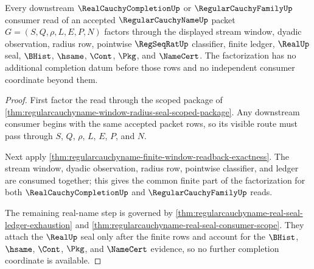 \begin{theorem}
\label{thm:regularcauchyname-bridge-consumer-factorization}
Every downstream $\RealCauchyCompletionUp$ or $\RegularCauchyFamilyUp$ consumer read of an accepted $\RegularCauchyNameUp$ packet $G=(S,Q,\rho,L,E,P,N)$ factors through the displayed stream window, dyadic observation, radius row, pointwise $\RegSeqRatUp$ classifier, finite ledger, $\RealUp$ seal, $\BHist$, $\hsame$, $\Cont$, $\Pkg$, and $\NameCert$. The factorization has no additional completion datum before those rows and no independent consumer coordinate beyond them.
\end{theorem}
\begin{proof}
First factor the read through the scoped package of \autoref{thm:regularcauchyname-window-radius-seal-scoped-package}. Any downstream consumer begins with the same accepted packet rows, so its visible route must pass through $S$, $Q$, $\rho$, $L$, $E$, $P$, and $N$.

Next apply \autoref{thm:regularcauchyname-finite-window-readback-exactness}. The stream window, dyadic observation, radius row, pointwise classifier, and ledger are consumed together; this gives the common finite part of the factorization for both $\RealCauchyCompletionUp$ and $\RegularCauchyFamilyUp$ reads.

The remaining real-name step is governed by \autoref{thm:regularcauchyname-real-seal-ledger-exhaustion} and \autoref{thm:regularcauchyname-real-seal-consumer-scope}. They attach the $\RealUp$ seal only after the finite rows and account for the $\BHist$, $\hsame$, $\Cont$, $\Pkg$, and $\NameCert$ evidence, so no further completion coordinate is available.
\end{proof}

